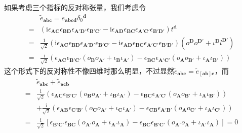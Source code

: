 如果考虑三个指标的反对称张量，我们考虑令
\begin{equation*}
	\begin{aligned}
		& \tilde{e}_{\boldsymbol{abc}} =e_{\boldsymbol{abcd}} \delta {_{0}}^{\boldsymbol{d}}\\
		= & (\mathrm{i} \epsilon \boldsymbol{_{AC}} \epsilon \boldsymbol{_{BD}} \epsilon _{\boldsymbol{A'D} '} \epsilon _{\boldsymbol{B} '\boldsymbol{C} '} -\mathrm{i} \epsilon _{\boldsymbol{AD}} \epsilon _{\boldsymbol{BC}} \epsilon \boldsymbol{_{A'C'}} \epsilon \boldsymbol{_{B'D'}} )t^{\boldsymbol{d}}\\
		= & \frac{1}{\sqrt{2}} (\mathrm{i} \epsilon \boldsymbol{_{AC}} \epsilon \boldsymbol{_{BD}} \epsilon _{\boldsymbol{A'D} '} \epsilon _{\boldsymbol{B} '\boldsymbol{C} '} -\mathrm{i} \epsilon _{\boldsymbol{AD}} \epsilon _{\boldsymbol{BC}} \epsilon \boldsymbol{_{A'C'}} \epsilon \boldsymbol{_{B'D'}} )(o^{\boldsymbol{D}} o^{\boldsymbol{D} '} +\iota ^{\boldsymbol{D}} l^{\boldsymbol{D} '} )\\
		= & \frac{\mathrm{i}}{\sqrt{2}} (\epsilon \boldsymbol{_{AC}} \epsilon _{\boldsymbol{B} '\boldsymbol{C} '}( o_{\boldsymbol{B}} o_{\boldsymbol{A} '} +\iota _{\boldsymbol{B}} \iota _{\boldsymbol{A} '}) -\epsilon _{\boldsymbol{BC}} \epsilon \boldsymbol{_{A'C'}}( o_{\boldsymbol{A}} o_{\boldsymbol{B} '} +\iota _{\boldsymbol{A}} \iota _{\boldsymbol{B} '}) )
	\end{aligned}
\end{equation*}
这个形式下的反对称性不像四维时那么明显，不过显然$\tilde{e}_{\boldsymbol{abc}} =\tilde{e}_{[\boldsymbol{ab}]\boldsymbol{c}}$，而
\begin{equation*}
	\begin{aligned}
		& \tilde{e}_{\boldsymbol{abc}} +\tilde{e}_{\boldsymbol{acb}}\\
		= & \frac{\mathrm{i}}{\sqrt{2}} (\epsilon \boldsymbol{_{AC}} \epsilon _{\boldsymbol{B} '\boldsymbol{C} '}( o_{\boldsymbol{B}} o_{\boldsymbol{A} '} +\iota _{\boldsymbol{B}} \iota _{\boldsymbol{A} '}) -\epsilon _{\boldsymbol{BC}} \epsilon \boldsymbol{_{A'C'}}( o_{\boldsymbol{A}} o_{\boldsymbol{B} '} +\iota _{\boldsymbol{A}} \iota _{\boldsymbol{B} '}) )\\
		& +\frac{\mathrm{i}}{\sqrt{2}} (\epsilon \boldsymbol{_{A\boldsymbol{B}}} \epsilon _{\boldsymbol{C} '\boldsymbol{B} '}( o_{\boldsymbol{C}} o_{\boldsymbol{A} '} +\iota _{\boldsymbol{C}} \iota _{\boldsymbol{A} '}) -\epsilon _{\boldsymbol{CB}} \epsilon \boldsymbol{_{A'\boldsymbol{B} '}}( o_{\boldsymbol{A}} o_{\boldsymbol{C} '} +\iota _{\boldsymbol{A}} \iota _{\boldsymbol{C} '}) )\\
		= & \frac{\mathrm{i}}{\sqrt{2}}[ \epsilon _{\boldsymbol{B} '\boldsymbol{C} '} \epsilon _{\boldsymbol{BC}}( o_{\boldsymbol{A} '} o_{\boldsymbol{A}} +\iota _{\boldsymbol{A} '} \iota _{\boldsymbol{A}}) -\epsilon _{\boldsymbol{BC}} \epsilon _{\boldsymbol{B} '\boldsymbol{C} '}( o_{\boldsymbol{A} '} o_{\boldsymbol{A}} +\iota _{\boldsymbol{A} '} \iota _{\boldsymbol{A}})] =0
	\end{aligned}
\end{equation*}
